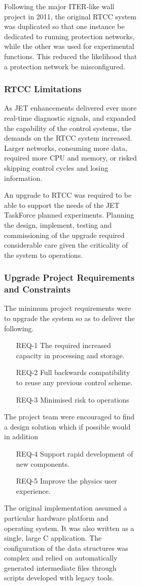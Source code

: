 \documentclass[preprint]{elsarticle}
\begin{document}
\begin{figure}[!p]
\begin{figure}[p]
\begin{figure}[p]
Following the major ITER-like wall project in 2011, the original RTCC
system was duplicated so that one instance be dedicated to running
protection networks, while the other was used for experimental functions\cite{edwardsRobustConfigurationJET2019}.
This reduced the likelihood that a protection network be misconfigured.

\subsubsection{RTCC Limitations}

As JET enhancements delivered ever more real-time diagnostic signals,
and expanded the capability of the control systems, the demands
on the RTCC system increased.  Larger networks, consuming more data,
required more CPU and memory, or risked skipping control cycles
and losing information.

An upgrade to RTCC was required to be able to support the needs
of the JET TaskForce planned experiments.  Planning the design, implement,
testing and commissioning of the upgrade required considerable
care given the criticality of the system to operations.


\subsubsection{Upgrade Project Requirements and Constraints}

The minimum project requirements were to 
upgrade the system so as to deliver the following.

\begin{itemize}
	\item[REQ-1]{The required increased capacity in processing and storage.}
	\item[REQ-2]{Full backwards compatibility to reuse any previous control scheme.}
	\item[REQ-3]{Minimised risk to operations}
\end{itemize}

The project team were encouraged to find a design solution which
if possible would in addition

\begin{enumerate}
	\item[REQ-4]{Support rapid development of new components.}
	\item[REQ-5]{Improve the physics user experience.}
\end{enumerate}

The original implementation assumed a particular hardware platform
and operating system.  It was also written as a single, large
C application.  The configuration of the data structures was
complex and relied on automatically generated intermediate
files through scripts developed with legacy tools. 


\end{figure}
\end{figure}
\end{figure}
\end{document}
